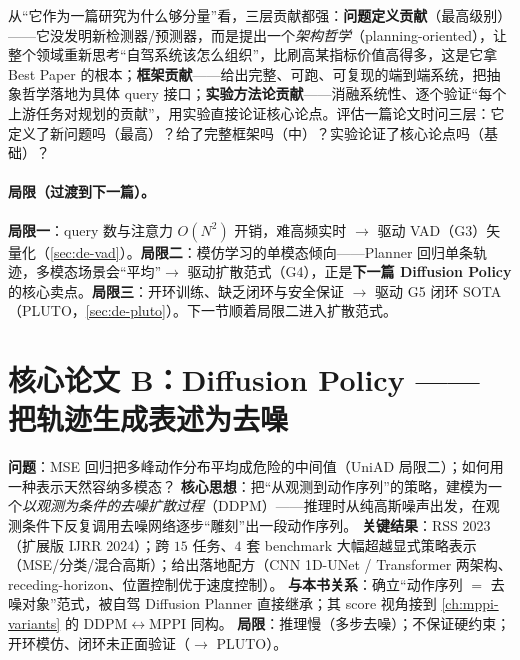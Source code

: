 \begin{insight}
从“它作为一篇研究为什么够分量”看，三层贡献都强：\textbf{问题定义贡献}（最高级别）——它没发明新检测器/预测器，而是提出一个\emph{架构哲学}（planning-oriented），让整个领域重新思考“自驾系统该怎么组织”，比刷高某指标价值高得多，这是它拿 Best Paper 的根本；\textbf{框架贡献}——给出完整、可跑、可复现的端到端系统，把抽象哲学落地为具体 query 接口；\textbf{实验方法论贡献}——消融系统性、逐个验证“每个上游任务对规划的贡献”，用实验直接论证核心论点。评估一篇论文时问三层：它定义了新问题吗（最高）？给了完整框架吗（中）？实验论证了核心论点吗（基础）？
\end{insight}

\paragraph{局限（过渡到下一篇）。}
\textbf{局限一}：query 数与注意力 $O(N^2)$ 开销，难高频实时 $\to$ 驱动 VAD（G3）矢量化（\cref{sec:de-vad}）。\textbf{局限二}：模仿学习的单模态倾向——Planner 回归单条轨迹，多模态场景会“平均”$\to$ 驱动扩散范式（G4），正是\textbf{下一篇 Diffusion Policy} 的核心卖点。\textbf{局限三}：开环训练、缺乏闭环与安全保证 $\to$ 驱动 G5 闭环 SOTA（PLUTO，\cref{sec:de-pluto}）。下一节顺着局限二进入扩散范式。

\section{核心论文 B：Diffusion Policy —— 把轨迹生成表述为去噪}
\label{sec:de-dp}

\begin{paper}\label{paper:de-dp}
\textbf{问题}：MSE 回归把多峰动作分布平均成危险的中间值（UniAD 局限二）；如何用一种表示天然容纳多模态？
\textbf{核心思想}\cite{chi2023diffusion}：把“从观测到动作序列”的策略，建模为一个\emph{以观测为条件的去噪扩散过程}（DDPM）——推理时从纯高斯噪声出发，在观测条件下反复调用去噪网络逐步“雕刻”出一段动作序列。
\textbf{关键结果}：RSS 2023（扩展版 IJRR 2024）；跨 $15$ 任务、$4$ 套 benchmark 大幅超越显式策略表示（MSE/分类/混合高斯）；给出落地配方（CNN 1D-UNet / Transformer 两架构、receding-horizon、位置控制优于速度控制）。
\textbf{与本书关系}：确立“动作序列 $=$ 去噪对象”范式，被自驾 Diffusion Planner 直接继承；其 score 视角接到 \cref{ch:mppi-variants} 的 DDPM$\leftrightarrow$MPPI 同构。
\textbf{局限}：推理慢（多步去噪）；不保证硬约束；开环模仿、闭环未正面验证（$\to$ PLUTO）。
\end{paper}

